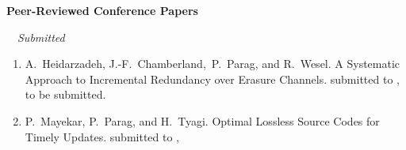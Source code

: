\documentclass[11pt]{article}
\newcommand{\blankline}{\quad\pagebreak[2]}
\begin{document}
%
%
%
%
%

	
%
%
%

\blankline

 \textbf{Peer-Reviewed Conference Papers}
 
 \blankline
 
 $\quad${\it Submitted}
 
 \begin{enumerate}
\addtocounter{enumi}{9}
	
\item[{\bf [C18]}] A.~Heidarzadeh, J.-F.~Chamberland,~P.~Parag, and R.~Wesel. 
\newblock  A Systematic Approach to Incremental Redundancy over Erasure Channels. 
submitted to ,
	to be submitted.
	
\item[{\bf [C17]}] P.~Mayekar, P.~Parag, and H.~Tyagi.
\newblock Optimal Lossless Source Codes for Timely Updates. 
submitted to , %
	
\end{enumerate}
\end{document}
